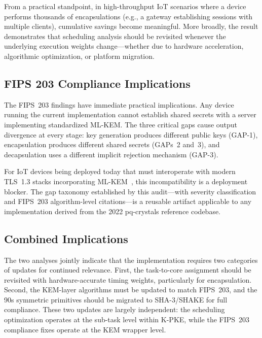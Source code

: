 \documentclass[journal]{IEEEtran}
\begin{document}
From a practical standpoint, in high-throughput IoT scenarios where a device performs thousands of encapsulations (e.g., a gateway establishing sessions with multiple clients), cumulative savings become meaningful. More broadly, the result demonstrates that scheduling analysis should be revisited whenever the underlying execution weights change---whether due to hardware acceleration, algorithmic optimization, or platform migration.

\subsection{FIPS 203 Compliance Implications}

The FIPS~203 findings have immediate practical implications. Any device running the current implementation cannot establish shared secrets with a server implementing standardized ML-KEM. The three critical gaps cause output divergence at every stage: key generation produces different public keys (GAP-1), encapsulation produces different shared secrets (GAPs~2 and~3), and decapsulation uses a different implicit rejection mechanism (GAP-3).

For IoT devices being deployed today that must interoperate with modern TLS~1.3 stacks incorporating ML-KEM~\cite{buerstinghaus2020}, this incompatibility is a deployment blocker. The gap taxonomy established by this audit---with severity classification and FIPS~203 algorithm-level citations---is a reusable artifact applicable to any implementation derived from the 2022 pq-crystals reference codebase.

\subsection{Combined Implications}

The two analyses jointly indicate that the implementation requires two categories of updates for continued relevance. First, the task-to-core assignment should be revisited with hardware-accurate timing weights, particularly for encapsulation. Second, the KEM-layer algorithms must be updated to match FIPS~203, and the 90s symmetric primitives should be migrated to SHA-3/SHAKE for full compliance. These two updates are largely independent: the scheduling optimization operates at the sub-task level within K-PKE, while the FIPS~203 compliance fixes operate at the KEM wrapper level.


\end{document}
